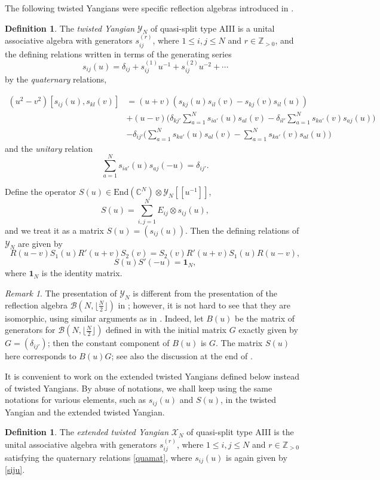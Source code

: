 \documentclass[11pt,reqno]{amsart}
\numberwithin{equation}{section}
\theoremstyle{definition}
\newtheorem{dfn}[thm]{Definition}
\theoremstyle{remark}
\newtheorem{rem}[thm]{Remark}
\newcommand{\beq}{\begin{equation}}
\newcommand{\eeq}{\end{equation}}
\newcommand{\bC}{\mathbb{C}}
\newcommand{\bZ}{\mathbb{Z}}
\newcommand{\End}{\mathrm{End}}
\newcommand{\lle}{\leqslant}
\newcommand{\Y}{{\mathscr{Y}}}
\newcommand{\scrX}{{\mathscr{X}}}
\begin{document}
The following twisted Yangians were specific reflection algebras \cite{Sk88} introduced in \cite{MR02}.

\begin{dfn}
The  \textit{twisted Yangian} $\Y_N$ of quasi-split type AIII is a unital associative algebra with generators $s_{ij}^{(r)}$, where $1\lle i,j\lle N$ and $r\in\bZ_{>0}$, and the defining relations written in terms of the generating series
\beq\label{siju}
s_{ij}(u)=  \delta_{ij}+s_{ij}^{(1)}u^{-1}+s_{ij}^{(2)}u^{-2}+\cdots
\eeq
by the \textit{quaternary} relations,



\beq\label{bcom}
\begin{split}
(u^2-v^2)[s_{ij}(u),s_{kl}(v)]&=  (u+v)(s_{kj}(u)s_{il}(v)-s_{kj}(v)s_{il}(u))\\
&  + (u-v)\Big(\delta_{kj'}\sum_{a=1}^N s_{ia'}(u)s_{al}(v)-\delta_{il'}\sum_{a=1}^N s_{ka'}(v)s_{aj}(u)\Big)\\
& - \delta_{ij'}\Big(\sum_{a=1}^N s_{ka'}(u)s_{al}(v)-\sum_{a=1}^N s_{ka'}(v)s_{al}(u)\Big)
\end{split}
\eeq
and the \textit{unitary} relation
\beq\label{bunit}
\sum_{a=1}^N s_{ia'}(u)s_{aj}(-u)=\delta_{ij'}.
\eeq
\end{dfn}
Define the operator $S(u)\in  \End(\bC^N)\otimes\Y_N[[u^{-1}]]$,
\[
S(u)=\sum_{i,j=1}^N E_{ij}\otimes s_{ij}(u),
\]
and we treat it as a matrix $S(u)=(s_{ij}(u))$. Then the defining relations of $\Y_N$ are given by
\beq\label{quamat}
R(u-v)S_1(u)R'(u+v)S_2(v)=S_2(v)R'(u+v)S_1(u)R(u-v),
\eeq
\beq\label{unimat}
S(u)S'(-u)=\mathbf{1}_N,
\eeq
where $\mathbf{1}_N$ is the identity matrix.
\begin{rem}
The presentation of $\Y_N$ is different from the presentation of the reflection algebra $\mathcal B(N,\lfloor\frac{N}{2}\rfloor)$ in \cite[\S 2]{MR02}; however, it is not hard to see that they are isomorphic, using similar arguments as in \cite[\S2.15]{Mol07}. Indeed, let $B(u)$ be the matrix of generators for $\mathcal B(N,\lfloor\frac{N}{2}\rfloor)$ defined in \cite[(2.13)]{MR02} with the initial matrix $G$ exactly given by $G=(\delta_{ij'})$; then the constant component of $B(u)$ is $G$. The matrix $S(u)$ here corresponds to $B(u)G$; see also the discussion at the end of \cite[\S2]{MR02}.
\end{rem}

It is convenient to work on the extended twisted Yangians defined below instead of twisted Yangians. By abuse of notations, we shall keep using the same notations for various elements, such as $s_{ij}(u)$ and $S(u)$, in the twisted Yangian and the extended twisted Yangian.
\begin{dfn}\label{eradef}
The \textit{extended twisted Yangian} $\scrX_N$ of quasi-split type AIII is the unital associative algebra  with generators $s_{ij}^{(r)}$, where $1\lle i,j\lle N$ and $r\in\bZ_{>0}$ satisfying the quaternary relations \eqref{quamat}, where $s_{ij}(u)$ is again given by \eqref{siju}.
\end{dfn}
\end{document}
